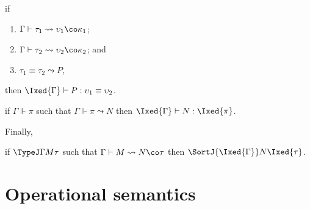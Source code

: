 \documentclass[authoryear,acmsmall,screen]{acmart}
\begin{document}
\begin{theorem}
  if
  \begin{enumerate}
  \item $\Gamma \vdash \tau_{1} \leadsto \upsilon_{1} \co \kappa_{1}$;
  \item $\Gamma \vdash \tau_{2} \leadsto \upsilon_{2} \co \kappa_{2}$; and
  \item $\tau_{1} \equiv \tau_{2} \leadsto P$,
  \end{enumerate}
 then $\Ixed{\Gamma} \vdash P : \upsilon_{1} \equiv \upsilon_{2}$.
\end{theorem}

\begin{theorem}
  if $\Gamma \Vdash \pi$ such that $\Gamma \Vdash \pi \leadsto N$ then $\Ixed{\Gamma} \vdash N : \Ixed{\pi}$.
\end{theorem}

Finally,

\begin{theorem}
  if $\TypeJ \Gamma M \tau$ such that $\Gamma \vdash M \leadsto N \co \tau$ then $\SortJ {\Ixed{\Gamma}} N {\Ixed{\tau}}$.
\end{theorem}


\section{Operational semantics}




\end{document}
